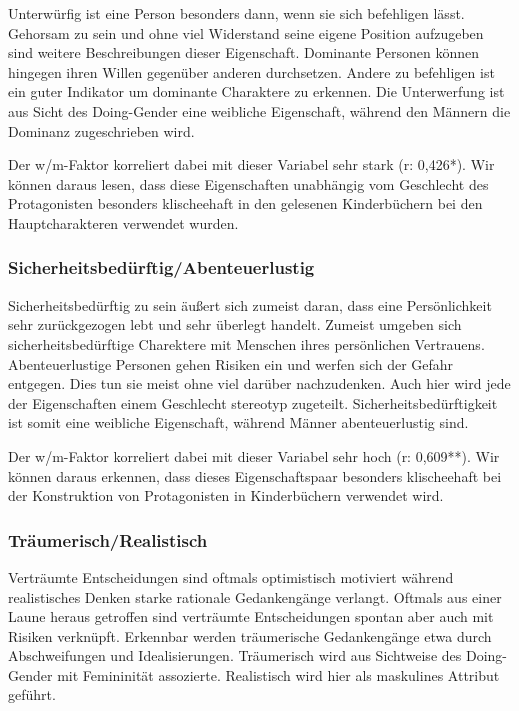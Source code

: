 Unterwürfig ist eine Person besonders dann, wenn sie sich befehligen
lässt. Gehorsam zu sein und ohne viel Widerstand seine eigene Position
aufzugeben sind weitere Beschreibungen dieser Eigenschaft. Dominante
Personen können hingegen ihren Willen gegenüber anderen durchsetzen.
Andere zu befehligen ist ein guter Indikator um dominante Charaktere zu
erkennen. Die Unterwerfung ist aus Sicht des Doing-Gender eine weibliche
Eigenschaft, während den Männern die Dominanz zugeschrieben wird.

Der w/m-Faktor korreliert dabei mit dieser Variabel sehr stark (r:
0,426*). Wir können daraus lesen, dass diese Eigenschaften unabhängig
vom Geschlecht des Protagonisten besonders klischeehaft in den gelesenen
Kinderbüchern bei den Hauptcharakteren verwendet wurden.

\subsubsection{Sicherheitsbedürftig/Abenteuerlustig}

Sicherheitsbedürftig zu sein äußert sich zumeist daran, dass eine
Persönlichkeit sehr zurückgezogen lebt und sehr überlegt handelt.
Zumeist umgeben sich sicherheitsbedürftige Charektere mit Menschen ihres
persönlichen Vertrauens. Abenteuerlustige Personen gehen Risiken ein und
werfen sich der Gefahr entgegen. Dies tun sie meist ohne viel darüber
nachzudenken. Auch hier wird jede der Eigenschaften einem Geschlecht
stereotyp zugeteilt. Sicherheitsbedürftigkeit ist somit eine weibliche
Eigenschaft, während Männer abenteuerlustig sind.

Der w/m-Faktor korreliert dabei mit dieser Variabel sehr hoch (r:
0,609**). Wir können daraus erkennen, dass dieses Eigenschaftspaar
besonders klischeehaft bei der Konstruktion von Protagonisten in
Kinderbüchern verwendet wird.

\subsubsection{Träumerisch/Realistisch}

Verträumte Entscheidungen sind oftmals optimistisch motiviert während
realistisches Denken starke rationale Gedankengänge verlangt. Oftmals
aus einer Laune heraus getroffen sind verträumte Entscheidungen spontan
aber auch mit Risiken verknüpft. Erkennbar werden träumerische
Gedankengänge etwa durch Abschweifungen und Idealisierungen. Träumerisch
wird aus Sichtweise des Doing-Gender mit Femininität assozierte.
Realistisch wird hier als maskulines Attribut geführt.

